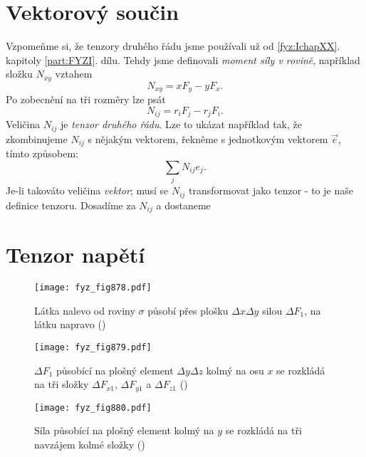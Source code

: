   \section{Vektorový součin}\label{fyz:IIchapXXXIsecV}   
    Vzpomeňme si, že tenzory druhého řádu jsme používali už od \ref{fyz:IchapXX}. kapitoly
    \ref{part:FYZI}. dílu. Tehdy jsme definovali \emph{moment síly v rovině}, například složku
    \(N_{xy}\) vztahem 
    \begin{equation*}
      N_{xy} = xF_y-yF_x.
    \end{equation*}
    Po zobecnění na tři rozměry lze psát
    \begin{equation}\label{fyz:eq842}
      N_{ij} = r_iF_j-r_jF_i.
    \end{equation}
    Veličina \(N_{ij}\) je \emph{tenzor druhého řádu}. Lze to ukázat například tak, že zkombinujeme
    \(N_{ij}\) s nějakým vektorem, řekněme s jednotkovým vektorem \(\vec{e}\), tímto způsobem:
    \begin{equation*}
      \sum_jN_{ij}e_j.
    \end{equation*}
    Je-li takováto veličina \emph{vektor}; musí se \(N_{ij}\) transformovat jako tenzor - to je naše
    definice tenzoru. Dosadíme za \(N_{ij}\) a dostaneme

  \section{Tenzor napětí}\label{fyz:IIchapXXXIsecVI} 

    \begin{figure}[ht!] %
      \centering
      \texttt{[image: fyz\_fig878.pdf]}
      \caption{Látka nalevo od roviny \(\sigma\) působí přes plošku \(\Delta x\Delta y\) silou
              \(\Delta F_1\), na látku napravo (\cite[s.~583]{Feynman02})}
      \label{fyz:fig878}
    \end{figure}

    \begin{figure}[ht!] %
      \centering
      \texttt{[image: fyz\_fig879.pdf]}
      \caption{\(\Delta F_1\) působící na plošný element \(\Delta y\Delta z\) kolmý na osu \(x\) se
              rozkládá na tři složky \(\Delta F_{x1}\), \(\Delta F_{y1}\) a \(\Delta F_{z1}\)
              (\cite[s.~584]{Feynman02})}
      \label{fyz:fig879}
    \end{figure}

    \begin{figure}[ht!] %
      \centering
      \texttt{[image: fyz\_fig880.pdf]}
      \caption{Síla působící na plošný element kolmý na \(y\) se rozkládá na tři navzájem kolmé
               složky (\cite[s.~584]{Feynman02})}
      \label{fyz:fig880}
    \end{figure}

